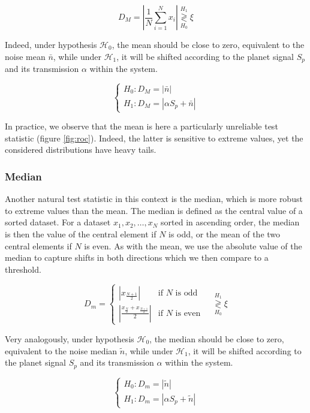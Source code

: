 \documentclass{article}
\begin{document}
$$
D_{M} = \left|\frac{1}{N}\sum_{i=1}^N x_i \right| \stackrel{H_1}{\underset{H_0}{\gtrless}} \xi
$$

Indeed, under hypothesis $\mathcal{H}_0$, the mean should be close to zero, equivalent to the noise mean $\bar{n}$, while under $\mathcal{H}_1$, it will be shifted according to the planet signal $S_p$ and its transmission $\alpha$ within the system.

$$
\begin{cases}
H_0 : D_M = |\bar{n}|\\
H_1 : D_M =  |\alpha S_p + \bar{n}|
\end{cases}
$$

In practice, we observe that the mean is here a particularly unreliable test statistic (figure \ref{fig:roc}). Indeed, the latter is sensitive to extreme values, yet the considered distributions have heavy tails.

\subsubsection{Median}
Another natural test statistic in this context is the median, which is more robust to extreme values than the mean. The median is defined as the central value of a sorted dataset. For a dataset $x_1, x_2, \ldots, x_N$ sorted in ascending order, the median is then the value of the central element if $N$ is odd, or the mean of the two central elements if $N$ is even. As with the mean, we use the absolute value of the median to capture shifts in both directions which we then compare to a threshold.

$$
D_m = 
\begin{cases}
\left| x_{\frac{N+1}{2}} \right| & \text{if }N\text{ is odd} \\

\left| \frac{x_{\frac{N}{2}} + x_{\frac{N+1}{2}}}{2} \right|  & \text{if }N\text{ is even}
\end{cases}
\quad\stackrel{H_1}{\underset{H_0}{\gtrless}} \xi
$$

Very analogously, under hypothesis $\mathcal{H}_0$, the median should be close to zero, equivalent to the noise median $\tilde{n}$, while under $\mathcal{H}_1$, it will be shifted according to the planet signal $S_p$ and its transmission $\alpha$ within the system.

$$
\begin{cases}
H_0 : D_m = |\tilde{n}|\\
H_1 : D_m =  | \alpha S_p + \tilde{n} |
\end{cases}
$$
\end{document}
